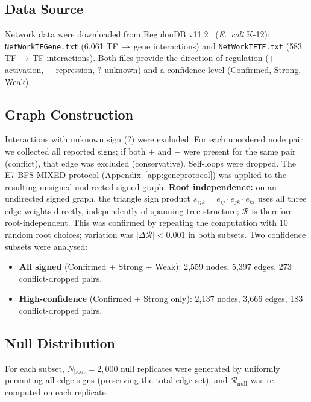 \documentclass[12pt,a4paper]{article}
\newcommand{\R}{\mathcal{R}}           %
\theoremstyle{plain}
\theoremstyle{definition}
\theoremstyle{remark}
\begin{document}
\subsection*{Data Source}

Network data were downloaded from RegulonDB v11.2~\citep{SantosZavaleta2019}
(\textit{E.~coli} K-12):
\texttt{NetWorkTFGene.txt} (6{,}061 TF\,$\to$\,gene interactions) and
\texttt{NetWorkTFTF.txt} (583 TF\,$\to$\,TF interactions).
Both files provide the direction of regulation ($+$ activation, $-$ repression,
$?$ unknown) and a confidence level (Confirmed, Strong, Weak).

\subsection*{Graph Construction}

Interactions with unknown sign ($?$) were excluded.
For each unordered node pair we collected all reported signs; if both $+$ and $-$
were present for the same pair (conflict), that edge was excluded (conservative).
Self-loops were dropped.
The E7 BFS MIXED protocol (Appendix~\ref{app:geneprotocol}) was applied to the
resulting unsigned undirected signed graph.
\textbf{Root independence:} on an undirected signed graph, the triangle sign
product $s_{ijk}=e_{ij}\cdot e_{jk}\cdot e_{ki}$ uses all three edge weights
directly, independently of spanning-tree structure; $\R$ is therefore root-independent.
This was confirmed by repeating the computation with 10 random root choices;
variation was $|\Delta\R|<0.001$ in both subsets.
Two confidence subsets were analysed:

\begin{itemize}
  \item \textbf{All signed} (Confirmed + Strong + Weak): 2{,}559 nodes,
    5{,}397 edges, 273 conflict-dropped pairs.
  \item \textbf{High-confidence} (Confirmed + Strong only): 2{,}137 nodes,
    3{,}666 edges, 183 conflict-dropped pairs.
\end{itemize}

\subsection*{Null Distribution}

For each subset, $N_\text{boot}=2{,}000$ null replicates were generated by
uniformly permuting all edge signs (preserving the total edge set), and
$\R_\text{null}$ was re-computed on each replicate.
\end{document}
